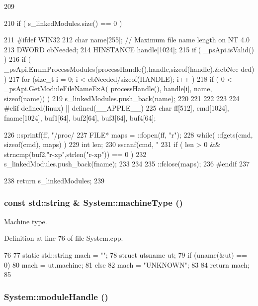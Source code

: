 \begin{DoxyCode}
209                                                     {
210   if ( s_linkedModules.size() == 0 )    {
211 #ifdef WIN32
212     char   name[255];  // Maximum file name length on NT 4.0
213     DWORD  cbNeeded;
214     HINSTANCE handle[1024];
215     if ( _psApi.isValid() )    {
216       if ( _psApi.EnumProcessModules(processHandle(),handle,sizeof(handle),&cbNee
      ded) )   {
217         for (size_t i = 0; i < cbNeeded/sizeof(HANDLE); i++ )    {
218           if ( 0 < _psApi.GetModuleFileNameExA( processHandle(), handle[i], name,
       sizeof(name)) )   {
219             s_linkedModules.push_back(name);
220           }
221         }
222       }
223     }
224 #elif defined(linux) || defined(__APPLE__)
225     char ff[512], cmd[1024], fname[1024], buf1[64], buf2[64], buf3[64], buf4[64];
      
226     ::sprintf(ff, "/proc/%
227     FILE* maps = ::fopen(ff, "r");
228     while( ::fgets(cmd, sizeof(cmd), maps) ) {
229       int len;
230       sscanf(cmd, "%
231       if ( len > 0 && strncmp(buf2,"r-xp",strlen("r-xp")) == 0 ) {
232         s_linkedModules.push_back(fname);
233       }
234     }
235     ::fclose(maps);
236 #endif
237   }
238   return s_linkedModules;
239 }
\end{DoxyCode}
\hypertarget{namespaceSystem_a21d0ee3eb17ae5ed59b3c6c01efce8d9}{
\subsubsection[{machineType}]{\setlength{\rightskip}{0pt plus 5cm}const std::string \& System::machineType ()}}
\label{namespaceSystem_a21d0ee3eb17ae5ed59b3c6c01efce8d9}


Machine type. 

Definition at line 76 of file System.cpp.


\begin{DoxyCode}
76                                      {
77   static std::string mach = "";
78   struct utsname ut;
79   if (uname(&ut) == 0) {
80     mach = ut.machine;
81   } else {
82     mach = "UNKNOWN";
83   }
84   return mach;
85 }
\end{DoxyCode}
\hypertarget{namespaceSystem_ab88d0de1d6850b6f95522e9c242eeab0}{
\subsubsection[{moduleHandle}]{ System::moduleHandle ()}}
\label{namespaceSystem_ab88d0de1d6850b6f95522e9c242eeab0}


